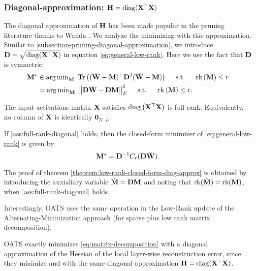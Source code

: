 \subsubsection{Diagonal-approximation: $\mathbf{H} = \operatorname{diag}({\mathbf{X}^\top\mathbf{X}})$}\label{subsection-diagonal-approximation}
\vspace{-3pt}
The diagonal approximation of $\mathbf{H}$ has been made popular in the pruning literature thanks to Wanda \cite{sun2023simple}. We analyze the minimizing \Ptwo with this approximation. Similar to \ref{subsection-pruning-diagonal-approximation}, we introduce $\mathbf{D} = \sqrt{\operatorname{diag}({\mathbf{X}^\top\mathbf{X}})}$ in equation \eqref{eq:general-low-rank}. Here we use the fact that $\mathbf{D}$ is symmetric.
\begin{align*}
   \bfM^\star 
   &\in \argmin\nolimits_{\bfM} \,\, \Tr{(\lowrankW - \bfM)^\top \bfD^2 (\lowrankW - \bfM)} ~~~~\text{s.t. } ~~~\rk{\bfM} \leq r\\
   &= \argmin\nolimits_{\bfM} \,\, \left\|\bfD \lowrankW -\bfD \bfM\right\|_F^2 ~~~~\text{s.t. } ~~~\rk{\bfM} \leq r.
\end{align*}

\begin{assumption}\label{ass:full-rank-diagonal}
The input activations matrix $\mathbf{X}$ satisfies $\operatorname{diag}\left({\mathbf{X}^\top\mathbf{X}}\right)$ is full-rank. Equivalently, no column of $\mathbf{X}$ is identically $\mathbf{0}_{N \cdot L}$.
\end{assumption}
\begin{theorem}\label{theorem:low-rank-closed-form-diag-approx}
    If \cref{ass:full-rank-diagonal} holds, then the closed-form minimizer of \eqref{eq:general-low-rank} is given by
    \begin{equation*}
        \mathbf{M}^\star = \mathbf{D}^{-1} C_r(\mathbf{D} \Bar{\mathbf{W}}).
    \end{equation*}
\end{theorem}
The proof of theorem \ref{theorem:low-rank-closed-form-diag-approx} is obtained by introducing the auxialiary variable $\tilde{\mathbf{M}} = \mathbf{D} \mathbf{M}$ and noting that $\operatorname{rk}({\tilde{\mathbf{M}}}) = \operatorname{rk}({\mathbf{M}})$, when \cref{ass:full-rank-diagonal} holds.

Interestingly, OATS \cite{zhang2024oats} uses the same operation in the Low-Rank update of the Alternating-Minimization approach (for sparse plus low rank matrix decomposition). 
\begin{corollary}
OATS \cite{zhang2024oats} exactly minimizes \eqref{eq:matrix-decomposition} with a diagonal approximation of the Hessian of the local layer-wise reconstruction error, since they minimize \Pone and \Ptwo with the same diagonal approximation $\mathbf{H} = \operatorname{diag}({\mathbf{X}^\top\mathbf{X}})$.
\end{corollary}
\vspace{-2pt}
